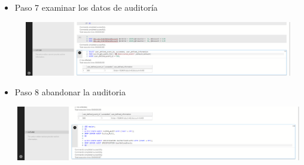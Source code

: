 \begin{itemize}
   	      \item Paso 7 examinar los datos de auditoría
				 
				 	
					\begin{center}
    				\includegraphics[width=16cm, height=90]{./Imagenes/Imagen__26}
   				    \end{center}
   				    
   	      \item Paso 8 abandonar la auditoria
				 
				 	
					\begin{center}
    				\includegraphics[width=16cm, height=90]{./Imagenes/Imagen__27}
   				    \end{center}
   				    
   		   


\end{itemize}
\clearpage	

